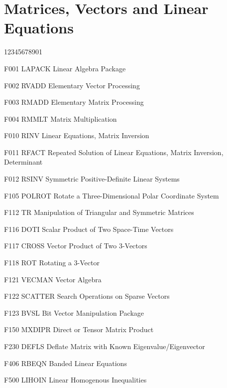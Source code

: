 \section*{Matrices, Vectors and Linear Equations}
\begin{DLtt}{12345678901}
\item[F001 LAPACK] Linear Algebra Package
\item[F002 RVADD] Elementary Vector Processing
\item[F003 RMADD] Elementary Matrix Processing
\item[F004 RMMLT] Matrix Multiplication
\item[F010 RINV] Linear Equations, Matrix Inversion
\item[F011 RFACT] Repeated Solution of Linear Equations, Matrix Inversion, Determinant
\item[F012 RSINV] Symmetric Positive-Definite Linear Systems
\item[F105 POLROT] Rotate a Three-Dimensional Polar Coordinate System
\item[F112 TR] Manipulation of Triangular and Symmetric Matrices 
\item[F116 DOTI] Scalar Product of Two Space-Time Vectors
\item[F117 CROSS] Vector Product of Two 3-Vectors
\item[F118 ROT] Rotating a 3-Vector
\item[F121 VECMAN] Vector Algebra
\item[F122 SCATTER] Search Operations on Sparse Vectors
\item[F123 BVSL] Bit Vector Manipulation Package
\item[F150 MXDIPR] Direct or Tensor Matrix Product
\item[F230 DEFLS] Deflate Matrix with Known Eigenvalue/Eigenvector
\item[F406 RBEQN] Banded Linear Equations
\item[F500 LIHOIN] Linear Homogenous Inequalities
\end{DLtt}
